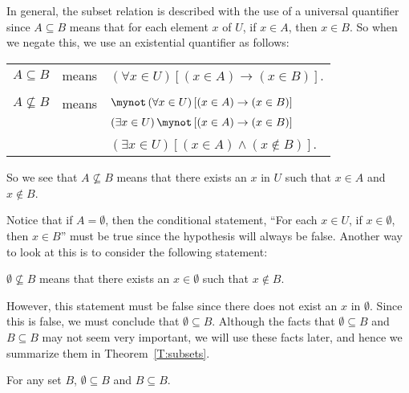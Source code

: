 In general, the subset relation is described with the use of a universal quantifier since $A \subseteq B$ means that for each element $x$ of $U$, if $x \in A$, then  $x \in B$.   So when we negate this, we use an existential quantifier as follows:
\begin{center}
\begin{tabular}{l l l}
 $A \subseteq B$  &  \qquad means \qquad &  $\left( {\forall x \in U} \right)\left[ {\left( {x \in A} \right) \to \left( {x \in B} \right)} \right]$. \\
  &  &  \\
$A \not\subseteq B$  &  \qquad means \qquad &    $\mynot  \left( {\forall x \in U} \right)\left[ {\left( {x \in A} \right) \to \left( {x \in B} \right)} \right]$  \\
  &  &  $\left( {\exists x \in U} \right) \mynot  \left[ {\left( {x \in A} \right) \to \left( {x \in B} \right)} \right]$ \\
  &  &  $\left( {\exists x \in U} \right)\left[ {\left( {x \in A} \right) \wedge \left( {x \notin B} \right)} \right]$. \\ 
\end{tabular}
\end{center}
So we see that  $A \not\subseteq B$ \label{sym:notsubset2}  means that there exists an  $x$ in $U$  such that  $x \in A$  and  $x \notin B$.

Notice that if $A = \emptyset$, then the conditional statement, ``For each $x \in U$, 
if $x \in \emptyset$, then $x \in B$'' must be true since the hypothesis will always be false.  Another way to look at this is to consider the following statement:

\begin{center}
$\emptyset \not \subseteq B$ means that there exists an $x \in \emptyset$ such that $x \notin B$.
\end{center}
However, this statement must be false since there does not exist an $x$ in $\emptyset$.  Since this is false, we must conclude that $\emptyset \subseteq B$.  Although the facts that $\emptyset \subseteq B$ and $B \subseteq B$ may not seem very important, we will use these facts later, and hence we  summarize them in Theorem~\ref{T:subsets}.

\begin{theorem} \label{T:subsets}
For any set  $B$, $\emptyset  \subseteq B$  and  $B \subseteq B$.  
\end{theorem}

